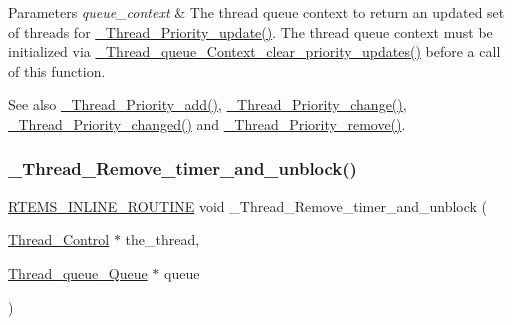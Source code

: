 \begin{DoxyParams}{Parameters}
{\em queue\+\_\+context} & The thread queue context to return an updated set of threads for \mbox{\hyperlink{group__RTEMSScoreThread_ga424ec96c6cbed5a748565333d5fd7d59}{\+\_\+\+Thread\+\_\+\+Priority\+\_\+update()}}. The thread queue context must be initialized via \mbox{\hyperlink{group__RTEMSScoreThreadQueue_gab84f558bc470437d43ce863f8024534e}{\+\_\+\+Thread\+\_\+queue\+\_\+\+Context\+\_\+clear\+\_\+priority\+\_\+updates()}} before a call of this function.\\
\hline
\end{DoxyParams}
\begin{DoxySeeAlso}{See also}
\mbox{\hyperlink{group__RTEMSScoreThread_ga58d04f5124606eff3a1da3d42cc79e2f}{\+\_\+\+Thread\+\_\+\+Priority\+\_\+add()}}, \mbox{\hyperlink{group__RTEMSScoreThread_ga76a9975ac0b320b0a00678534ab78f10}{\+\_\+\+Thread\+\_\+\+Priority\+\_\+change()}}, \mbox{\hyperlink{group__RTEMSScoreThread_ga3c72bf8623d4e8a6b4e5510cdbc4baac}{\+\_\+\+Thread\+\_\+\+Priority\+\_\+changed()}} and \mbox{\hyperlink{group__RTEMSScoreThread_ga8c1e1030ce5bea3614f62e8be650bbeb}{\+\_\+\+Thread\+\_\+\+Priority\+\_\+remove()}}. 
\end{DoxySeeAlso}
\mbox{\label{group__RTEMSScoreThread_ga02f96739e7d43b6203c1486f82349c93}} 
\subsubsection{\texorpdfstring{\_Thread\_Remove\_timer\_and\_unblock()}{\_Thread\_Remove\_timer\_and\_unblock()}}
{\footnotesize\ttfamily \mbox{\hyperlink{group__RTEMSScoreBaseDefs_gac216239df231d5dbd15e3520b0b9313f}{R\+T\+E\+M\+S\+\_\+\+I\+N\+L\+I\+N\+E\+\_\+\+R\+O\+U\+T\+I\+NE}} void \+\_\+\+Thread\+\_\+\+Remove\+\_\+timer\+\_\+and\+\_\+unblock (\begin{DoxyParamCaption}\item[{\mbox{\hyperlink{struct__Thread__Control}{Thread\+\_\+\+Control}} $\ast$}]{the\+\_\+thread,  }\item[{\mbox{\hyperlink{structThread__queue__Queue}{Thread\+\_\+queue\+\_\+\+Queue}} $\ast$}]{queue }\end{DoxyParamCaption})}



